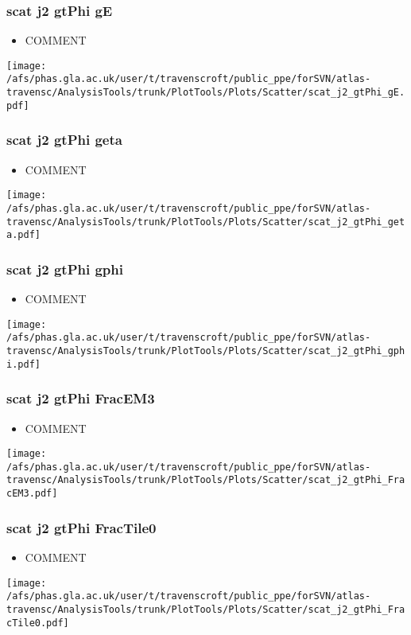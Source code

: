 \documentclass{beamer}
\begin{document}
\begin{frame}
\frametitle{scat j2 gtPhi gE}
\begin{itemize}
\item COMMENT
\end{itemize}
\begin{center}
\texttt{[image: /afs/phas.gla.ac.uk/user/t/travenscroft/public\_ppe/forSVN/atlas-travensc/AnalysisTools/trunk/PlotTools/Plots/Scatter/scat\_j2\_gtPhi\_gE.pdf]}
\end{center}
\end{frame}

\begin{frame}
\frametitle{scat j2 gtPhi geta}
\begin{itemize}
\item COMMENT
\end{itemize}
\begin{center}
\texttt{[image: /afs/phas.gla.ac.uk/user/t/travenscroft/public\_ppe/forSVN/atlas-travensc/AnalysisTools/trunk/PlotTools/Plots/Scatter/scat\_j2\_gtPhi\_geta.pdf]}
\end{center}
\end{frame}

\begin{frame}
\frametitle{scat j2 gtPhi gphi}
\begin{itemize}
\item COMMENT
\end{itemize}
\begin{center}
\texttt{[image: /afs/phas.gla.ac.uk/user/t/travenscroft/public\_ppe/forSVN/atlas-travensc/AnalysisTools/trunk/PlotTools/Plots/Scatter/scat\_j2\_gtPhi\_gphi.pdf]}
\end{center}
\end{frame}

\begin{frame}
\frametitle{scat j2 gtPhi FracEM3}
\begin{itemize}
\item COMMENT
\end{itemize}
\begin{center}
\texttt{[image: /afs/phas.gla.ac.uk/user/t/travenscroft/public\_ppe/forSVN/atlas-travensc/AnalysisTools/trunk/PlotTools/Plots/Scatter/scat\_j2\_gtPhi\_FracEM3.pdf]}
\end{center}
\end{frame}

\begin{frame}
\frametitle{scat j2 gtPhi FracTile0}
\begin{itemize}
\item COMMENT
\end{itemize}
\begin{center}
\texttt{[image: /afs/phas.gla.ac.uk/user/t/travenscroft/public\_ppe/forSVN/atlas-travensc/AnalysisTools/trunk/PlotTools/Plots/Scatter/scat\_j2\_gtPhi\_FracTile0.pdf]}
\end{center}
\end{frame}
\end{document}
